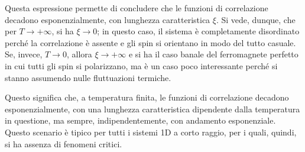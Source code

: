 \documentclass[11pt, a4paper]{scrartcl}
\theoremstyle{style}
\theoremstyle{style1}
\numberwithin{equation}{subsection}
\begin{document}
\begin{center}
	\begin{minipage}
		{.45\columnwidth}
Questa espressione permette di concludere che le funzioni di correlazione decadono esponenzialmente, con lunghezza caratteristica $\xi $.
Si vede, dunque, che per $T\to +\infty$, si ha $\xi \to 0$; in questo caso, il sistema \`e completamente disordinato perch\'e la correlazione \`e assente e gli spin si orientano in modo del tutto casuale.
Se, invece, $T \to 0$, allora $\xi \to +\infty$ e si ha il caso banale del ferromagnete perfetto in cui tutti gli spin si polarizzano, ma \`e un caso poco interessante perch\'e si stanno assumendo nulle fluttuazioni termiche.
	\end{minipage}
	\hfill
	\begin{minipage}
		{.45\columnwidth}
	\centering
	\end{minipage}
\end{center}
Questo significa che, a temperatura finita, le funzioni di correlazione decadono esponenzialmente, con una lunghezza caratteristica dipendente dalla temperatura in questione, ma sempre, indipendentemente, con andamento esponenziale.
Questo scenario \`e tipico per tutti i sistemi 1D a corto raggio, per i quali, quindi, si ha assenza di fenomeni critici.
\end{document}
